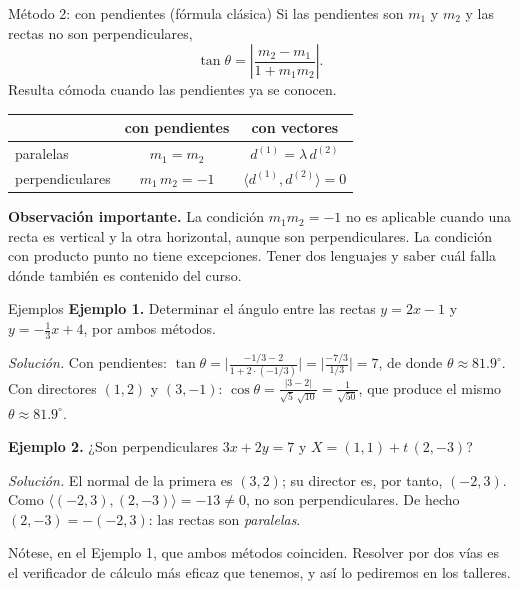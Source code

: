 \documentclass[aspectratio=169,10pt]{beamer}
\newcommand{\destaca}[1]{%
  \par\vspace{3pt}\noindent
  \colorbox{turquesaClaro}{%
    \parbox{\dimexpr\linewidth-2\fboxsep\relax}{\vspace{3pt}#1\vspace{3pt}}}%
  \par\vspace{3pt}}
\newcommand{\pp}[2]{\langle #1,#2\rangle}
\begin{document}
\begin{frame}{Método 2: con pendientes (fórmula clásica)}
  Si las pendientes son $m_1$ y $m_2$ y las rectas no son
  perpendiculares,
  \[
    \tan\theta=\left|\frac{m_2-m_1}{1+m_1m_2}\right| .
  \]
  Resulta cómoda cuando las pendientes ya se conocen.

  \vspace{0.3cm}
  \begin{center}
  {\small
  \begin{tabular}{@{}lcc@{}}
    \toprule
    & \textbf{con pendientes} & \textbf{con vectores} \\
    \midrule
    paralelas & $m_1=m_2$ & $d^{(1)}=\lambda\, d^{(2)}$ \\
    perpendiculares & $m_1\,m_2=-1$ & $\pp{d^{(1)}}{d^{(2)}}=0$ \\
    \bottomrule
  \end{tabular}}
  \end{center}

  \vspace{0.3cm}
  \destaca{\textbf{Observación importante.} La condición $m_1m_2=-1$
  no es aplicable cuando una recta es vertical y la otra horizontal,
  aunque son perpendiculares. La condición con producto punto no tiene
  excepciones. Tener dos lenguajes y saber cuál falla dónde también
  es contenido del curso.}
\end{frame}
\begin{frame}{Ejemplos}
  \textbf{Ejemplo 1.} Determinar el ángulo entre las rectas $y=2x-1$
  y $y=-\tfrac13 x+4$, por ambos métodos.

  \vspace{0.1cm}

  {\small \textit{Solución.} Con pendientes:
  $\tan\theta=\bigl|\tfrac{-1/3-2}{1+2\cdot(-1/3)}\bigr|
  =\bigl|\tfrac{-7/3}{1/3}\bigr|=7$, de donde
  $\theta\approx 81.9^\circ$. Con directores $(1,2)$ y $(3,-1)$:
  $\cos\theta=\tfrac{|3-2|}{\sqrt5\,\sqrt{10}}=\tfrac{1}{\sqrt{50}}$,
  que produce el mismo $\theta\approx 81.9^\circ$.}

  \vspace{0.3cm}

  \textbf{Ejemplo 2.} ¿Son perpendiculares $3x+2y=7$ y
  $X=(1,1)+t\,(2,-3)$?

  \vspace{0.1cm}

  {\small \textit{Solución.} El normal de la primera es $(3,2)$; su
  director es, por tanto, $(-2,3)$. Como
  $\pp{(-2,3)}{(2,-3)}=-13\neq 0$, no son perpendiculares. De hecho
  $(2,-3)=-(-2,3)$: las rectas son \textit{paralelas}.}

  \vspace{0.2cm}
  \destaca{\small Nótese, en el Ejemplo 1, que ambos métodos
  coinciden. Resolver por dos vías es el verificador de cálculo más
  eficaz que tenemos, y así lo pediremos en los talleres.}
\end{frame}
\end{document}
